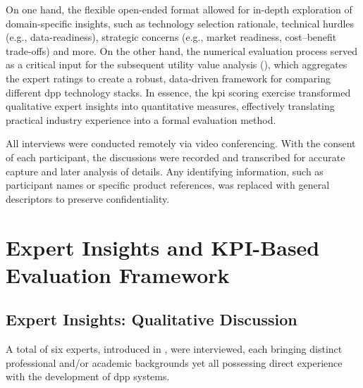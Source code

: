 On one hand, the flexible open-ended format allowed for in-depth exploration of domain-specific insights, such as technology selection rationale, technical hurdles (e.g., data-readiness), strategic concerns (e.g., market readiness, cost–benefit trade-offs) and more. On the other hand, the numerical evaluation process served as a critical input for the subsequent utility value analysis (), which aggregates the expert ratings to create a robust, data-driven framework for comparing different \ac{dpp} technology stacks. In essence, the \ac{kpi} scoring exercise transformed qualitative expert insights into quantitative measures, effectively translating practical industry experience into a formal evaluation method.

All interviews were conducted remotely via video conferencing. With the consent of each participant, the discussions were recorded and transcribed for accurate capture and later analysis of details. Any identifying information, such as participant names or specific product references, was replaced with general descriptors to preserve confidentiality.

\section{Expert Insights and KPI-Based Evaluation Framework}
\label{sec:expert_insights_evaluation}

\subsection{Expert Insights: Qualitative Discussion}
A total of six experts, introduced in , were interviewed, each bringing distinct professional and/or academic backgrounds yet all possessing direct experience with the development of \ac{dpp} systems.

